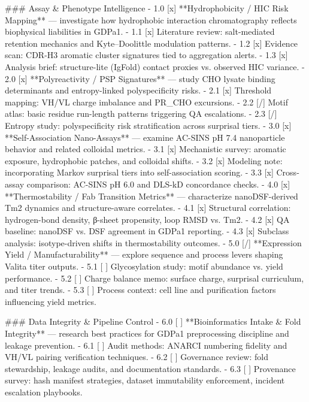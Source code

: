 ### Assay & Phenotype Intelligence
- 1.0 [x] **Hydrophobicity / HIC Risk Mapping** — investigate how hydrophobic interaction chromatography reflects biophysical liabilities in GDPa1.
  - 1.1 [x] Literature review: salt-mediated retention mechanics and Kyte–Doolittle modulation patterns.
  - 1.2 [x] Evidence scan: CDR-H3 aromatic cluster signatures tied to aggregation alerts.
  - 1.3 [x] Analysis brief: structure-lite (IgFold) contact proxies vs. observed HIC variance.
- 2.0 [x] **Polyreactivity / PSP Signatures** — study CHO lysate binding determinants and entropy-linked polyspecificity risks.
  - 2.1 [x] Threshold mapping: VH/VL charge imbalance and PR_CHO excursions.
  - 2.2 [/] Motif atlas: basic residue run-length patterns triggering QA escalations.
    - 2.3 [/] Entropy study: polyspecificity risk stratification across surprisal tiers.
- 3.0 [x] **Self-Association Nano-Assays** — examine AC-SINS pH 7.4 nanoparticle behavior and related colloidal metrics.
  - 3.1 [x] Mechanistic survey: aromatic exposure, hydrophobic patches, and colloidal shifts.
  - 3.2 [x] Modeling note: incorporating Markov surprisal tiers into self-association scoring.
  - 3.3 [x] Cross-assay comparison: AC-SINS pH 6.0 and DLS-kD concordance checks.
- 4.0 [x] **Thermostability / Fab Transition Metrics** — characterize nanoDSF-derived Tm2 dynamics and structure-aware correlates.
  - 4.1 [x] Structural correlation: hydrogen-bond density, β-sheet propensity, loop RMSD vs. Tm2.
  - 4.2 [x] QA baseline: nanoDSF vs. DSF agreement in GDPa1 reporting.
  - 4.3 [x] Subclass analysis: isotype-driven shifts in thermostability outcomes.
- 5.0 [/] **Expression Yield / Manufacturability** — explore sequence and process levers shaping Valita titer outputs.
  - 5.1 [ ] Glycosylation study: motif abundance vs. yield performance.
  - 5.2 [ ] Charge balance memo: surface charge, surprisal curriculum, and titer trends.
  - 5.3 [ ] Process context: cell line and purification factors influencing yield metrics.

### Data Integrity & Pipeline Control
- 6.0 [ ] **Bioinformatics Intake & Fold Integrity** — research best practices for GDPa1 preprocessing discipline and leakage prevention.
  - 6.1 [ ] Audit methods: ANARCI numbering fidelity and VH/VL pairing verification techniques.
  - 6.2 [ ] Governance review: fold stewardship, leakage audits, and documentation standards.
  - 6.3 [ ] Provenance survey: hash manifest strategies, dataset immutability enforcement, incident escalation playbooks.


